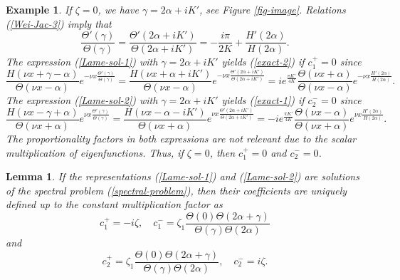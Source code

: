 \documentclass[10pt,a4paper]{amsart}
\newtheorem{example}{Example}
\newtheorem{lemma}{Lemma}
\begin{document}
\begin{example}
If $\zeta = 0$, we have $\gamma = 2 \alpha + i K'$, see Figure \ref{fig-image}.
Relations (\ref{Wei-Jac-3}) imply that 
$$
\frac{\Theta'(\gamma)}{\Theta(\gamma)} = \frac{\Theta'(2 \alpha + i K')}{\Theta(2 \alpha + i K')} = -\frac{i \pi}{2K} + \frac{H'(2\alpha)}{H(2\alpha)}.
$$
The expression (\ref{Lame-sol-1}) with $\gamma = 2 \alpha + i K'$ yields (\ref{exact-2})  if $c_1^+ = 0$ since 
$$
\frac{H(\nu x + \gamma - \alpha)}{\Theta(\nu x - \alpha)} e^{-\nu x \frac{\Theta'(\gamma)}{\Theta(\gamma)}} = 
\frac{H(\nu x + \alpha + iK')}{\Theta(\nu x - \alpha)} e^{-\nu x \frac{\Theta'(2 \alpha + i K')}{\Theta(2 \alpha + i K')}} = 
i e^{\frac{\pi K'}{4 K}} \frac{\Theta(\nu x + \alpha)}{\Theta(\nu x - \alpha)}
e^{-\nu x \frac{H'(2\alpha)}{H(2\alpha)}}.
$$
The expression (\ref{Lame-sol-2}) with $\gamma = 2 \alpha + i K'$ yields (\ref{exact-1}) if $c_2^- = 0$ since 
$$
\frac{H(\nu x - \gamma + \alpha)}{\Theta(\nu x + \alpha)} e^{\nu x \frac{\Theta'(\gamma)}{\Theta(\gamma)}} = 
\frac{H(\nu x - \alpha - iK')}{\Theta(\nu x + \alpha)} e^{\nu x \frac{\Theta'(2 \alpha + i K')}{\Theta(2 \alpha + i K')}} = 
-i e^{\frac{\pi K'}{4 K}} \frac{\Theta(\nu x - \alpha)}{\Theta(\nu x + \alpha)}
e^{\nu x \frac{H'(2\alpha)}{H(2\alpha)}}.
$$
The proportionality factors in both expressions are not relevant due to the scalar multiplication of eigenfunctions. Thus, if $\zeta = 0$, then $c_1^+ = 0$ and $c_2^- = 0$. 
\label{example-2}
\end{example}

\begin{lemma}
	\label{lem-coefficients}
If the representations (\ref{Lame-sol-1}) and (\ref{Lame-sol-2}) are solutions of the spectral problem (\ref{spectral-problem}), then their coefficients are uniquely defined up to the constant multiplication factor as 
\begin{equation}
\label{coefficient-1}
	c_1^+ = -i \zeta, \quad c_1^- = \zeta_1 \frac{\Theta(0) \Theta(2\alpha + \gamma)}{\Theta(\gamma) \Theta(2\alpha)}
\end{equation}
and
\begin{equation}
\label{coefficient-2}
c_2^+ = \zeta_1 \frac{\Theta(0) \Theta(2\alpha + \gamma)}{\Theta(\gamma) \Theta(2\alpha)}, \quad c_2^- = i \zeta.
\end{equation}
\end{lemma}
\end{document}
